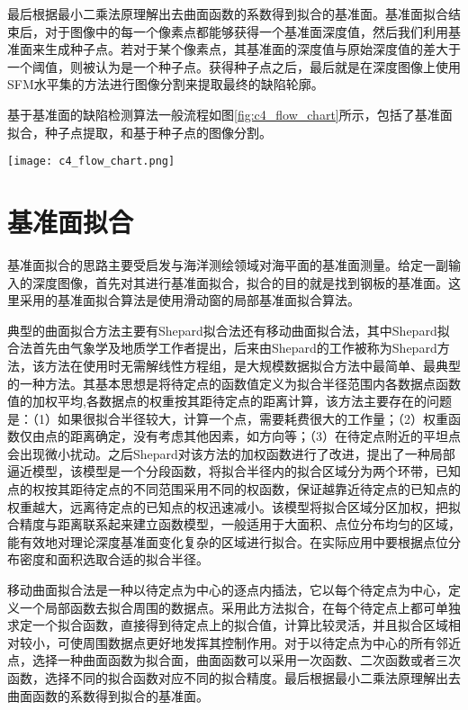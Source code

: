     最后根据最小二乘法原理解出去曲面函数的系数得到拟合的基准面。基准面拟合结束后，对于图像中的每一个像素点都能够获得一个基准面深度值，然后我们利用基准面来生成种子点。若对于某个像素点，其基准面的深度值与原始深度值的差大于一个阈值，则被认为是一个种子点。获得种子点之后，最后就是在深度图像上使用SFM水平集的方法进行图像分割来提取最终的缺陷轮廓。

    基于基准面的缺陷检测算法一般流程如图\ref{fig:c4_flow_chart}所示，包括了基准面拟合，种子点提取，和基于种子点的图像分割。

    \begin{figure*}[!h]
    \centering
    \texttt{[image: c4\_flow\_chart.png]}
    \caption{基于基准面的拟合的缺陷检测流程图}
    \label{fig:c4_flow_chart}
    \end{figure*}

    \section{基准面拟合}
    基准面拟合的思路主要受启发与海洋测绘领域对海平面的基准面测量\cite{孙学华2011海域无缝深度基准面的建立}。给定一副输入的深度图像，首先对其进行基准面拟合，拟合的目的就是找到钢板的基准面。这里采用的基准面拟合算法是使用滑动窗的局部基准面拟合算法。

    典型的曲面拟合方法主要有Shepard拟合法还有移动曲面拟合法，其中Shepard拟合法首先由气象学及地质学工作者提出，后来由Shepard的工作被称为Shepard方法，该方法在使用时无需解线性方程组，是大规模数据拟合方法中最简单、最典型的一种方法。其基本思想是将待定点的函数值定义为拟合半径范围内各数据点函数值的加权平均,各数据点的权重按其距待定点的距离计算，该方法主要存在的问题是：（1）如果很拟合半径较大，计算一个点，需要耗费很大的工作量；（2）权重函数仅由点的距离确定，没有考虑其他因素，如方向等；（3）在待定点附近的平坦点会出现微小扰动。之后Shepard对该方法的加权函数进行了改进，提出了一种局部逼近模型，该模型是一个分段函数，将拟合半径内的拟合区域分为两个环带，已知点的权按其距待定点的不同范围采用不同的权函数，保证越靠近待定点的已知点的权重越大，远离待定点的已知点的权迅速减小。该模型将拟合区域分区加权，把拟合精度与距离联系起来建立函数模型，一般适用于大面积、点位分布均匀的区域，能有效地对理论深度基准面变化复杂的区域进行拟合。在实际应用中要根据点位分布密度和面积选取合适的拟合半径。

    移动曲面拟合法是一种以待定点为中心的逐点内插法，它以每个待定点为中心，定义一个局部函数去拟合周围的数据点。采用此方法拟合，在每个待定点上都可单独求定一个拟合函数，直接得到待定点上的拟合值，计算比较灵活，并且拟合区域相对较小，可使周围数据点更好地发挥其控制作用。对于以待定点为中心的所有邻近点，选择一种曲面函数为拟合面，曲面函数可以采用一次函数、二次函数或者三次函数，选择不同的拟合函数对应不同的拟合精度。最后根据最小二乘法原理解出去曲面函数的系数得到拟合的基准面。


